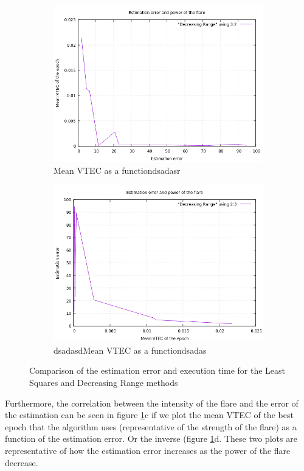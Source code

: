 \begin{figure}[!htb]
\begin{subfigure}[b]{0.5\textwidth}
		\includegraphics[width=\linewidth]{images/results/errorVSmeanVTEC.png}
		\caption{Mean VTEC as a functiondsadasr}
	\end{subfigure}
	\hfill
	\begin{subfigure}[b]{0.5\textwidth}
		\includegraphics[width=\linewidth]{images/results/meanVTECVSerror.png}
		\caption{dsadasdMean VTEC as a functiondsadas}
	\end{subfigure}
	\caption{Comparison of the estimation error and execution time for the Least Squares and Decreasing Range methods}
	\label{fig:comparisonDRLS}
\end{figure}

Furthermore, the correlation between the intensity of the flare and the error of the estimation can be seen in figure \ref{fig:comparisonDRLS}c if we plot the mean VTEC of the best epoch that the algorithm uses (representative of the strength of the flare) as a function of the estimation error. Or the inverse (figure \ref{fig:comparisonDRLS}d. These two plots are representative of how the estimation error increases as the power of the flare decrease.

